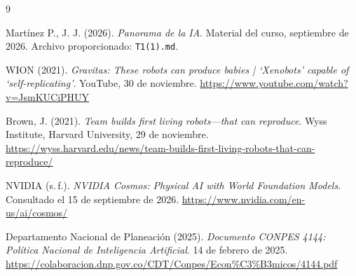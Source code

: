 \documentclass[14pt,twoside]{article}
\begin{document}
\begin{thebibliography}{9}

Martínez P., J. J. (2026).
\textit{Panorama de la IA}.
Material del curso, septiembre de 2026.
Archivo proporcionado: \texttt{T1(1).md}.

WION (2021).
\textit{Gravitas: These robots can produce babies |
`Xenobots' capable of `self-replicating'}.
YouTube, 30 de noviembre.
\url{https://www.youtube.com/watch?v=JsmKUCiPHUY}

Brown, J. (2021).
\textit{Team builds first living robots---that can reproduce}.
Wyss Institute, Harvard University, 29 de noviembre.
\url{https://wyss.harvard.edu/news/team-builds-first-living-robots-that-can-reproduce/}

NVIDIA (s.\,f.).
\textit{NVIDIA Cosmos: Physical AI with World Foundation Models}.
Consultado el 15 de septiembre de 2026.
\url{https://www.nvidia.com/en-us/ai/cosmos/}

Departamento Nacional de Planeación (2025).
\textit{Documento CONPES 4144:
Política Nacional de Inteligencia Artificial}.
14 de febrero de 2025.
\url{https://colaboracion.dnp.gov.co/CDT/Conpes/Econ%C3%B3micos/4144.pdf}

\end{thebibliography}
\end{document}
